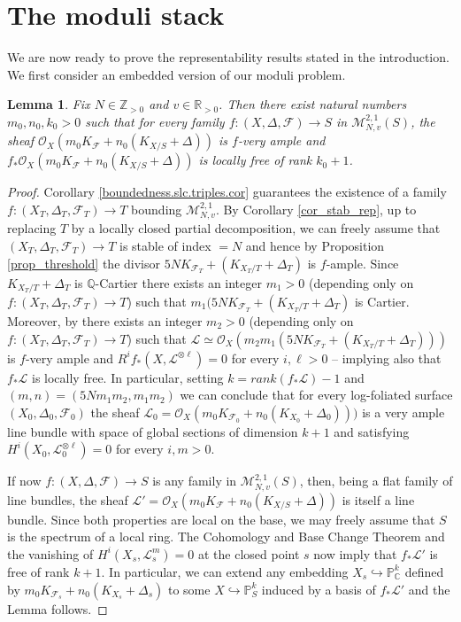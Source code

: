 \documentclass[12pt, a4paper]{amsart}
\newcommand\CC{\mathbb{C}}
\newcommand\PP{\mathbb{P}}
\newcommand\OO{\mathcal{O}}
\newcommand\FF{\mathcal{F}}
\newcommand\LL{\mathcal{L}}
\newcounter{Theorem}
\newtheorem{lemma}[theorem]{Lemma}
\theoremstyle{definition}
\theoremstyle{named}
\begin{document}
\section{The moduli stack}
We are now ready to prove the representability results stated in the introduction. 
We first consider an embedded version of our moduli problem.

\begin{lemma}  \label{emb}
Fix $N \in \mathbb Z_{>0}$ and $v \in \mathbb R_{>0}$.  Then
    there exist natural numbers $m_0,n_0,k_0>0$ such that for every family $f: (X, \Delta, \FF)\to S$ in $\mathcal M^{2,1}_{N, v}(S)$, the sheaf $\OO_X(m_0 K_\FF + n_0 (K_{X/S}+\Delta))$ is $f$-very ample and $f_*\OO_X(m_0 K_\FF + n_0 (K_{X/S}+\Delta))$ is locally free of rank $k_0+1$.
\end{lemma}
\begin{proof}
Corollary \ref{boundedness.slc.triples.cor} guarantees the existence of a family $f\colon (X_T,\Delta_T, \FF_T)\to T$ bounding $\mathcal M^{2,1}_{N, v}$. By Corollary \ref{cor_stab_rep}, up to replacing $T$ by a locally closed partial decomposition,  we can freely assume that $(X_T, \Delta_T, \FF_T) \to T$ is  stable of index $=N$ and hence by Proposition \ref{prop_threshold} the divisor $5NK_{\mathcal F_T}+(K_{X_T/T}+\Delta_T)$
is $f$-ample. Since $K_{X_T/T}+\Delta_T$ is $\mathbb Q$-Cartier 
there exists an integer $m_1>0$ (depending only on $f\colon (X_T, \Delta_T, \FF_T) \to T$) 
such that $m_1(5NK_{\mathcal F_T}+(K_{X_T/T}+\Delta_T)$ is Cartier. Moreover, by \cite[Theorem 1.7.6]{Lazarsfeld04a} there exists an integer $m_2>0$ (depending only on $f\colon (X_T, \Delta_T, \FF_T) \to T$) 
such that  $\LL\simeq \OO_X(m_2m_1(5N K_{\FF_T}+(K_{X_T/T}+\Delta_T)))$ is $f$-very ample and $R^if_*(X,\LL^{\otimes \ell})=0$ for every $i,\ell>0$ -- implying also that $f_*\LL$ is locally free.
In particular, setting $k=rank(f_*\LL)-1$ and $(m,n)=(5Nm_1m_2,m_1m_2)$ we can conclude that for every log-foliated surface $(X_0,\Delta_0,\FF_0)$  the sheaf $\LL_0=\OO_X(m_0 K_{\FF_0}+n_0(K_{X_0}+\Delta_0)))$ is a very ample line bundle with space of global sections of dimension $k+1$ and satisfying  $H^i(X_0,\LL_0^{\otimes \ell})=0$ for every $i,m>0$.


If now $f\colon (X,\Delta,\FF)\to S$ is any family in $\mathcal M^{2,1}_{N, v}(S)$, then, being a flat family of line bundles, the sheaf $\LL'=\OO_X(m_0K_\FF +n_0(K_{X/S}+\Delta))$ is itself a line bundle. Since both properties are local on the base, we may freely assume that $S$ is the spectrum of a local ring. The Cohomology and Base Change Theorem and the vanishing of $H^i(X_s,\LL_s^m)=0$ at the closed point $s$ now imply that $f_*\LL'$ is free of rank $k+1$. In particular,  
we can extend any embedding $X_s\hookrightarrow \PP^k_\CC$ defined by $m_0K_{\FF_s}+n_0(K_{X_s}+\Delta_s)$ to some $X\hookrightarrow \PP^k_S$ induced by a basis of $f_*\LL'$ and the Lemma follows.
\end{proof}
\end{document}
